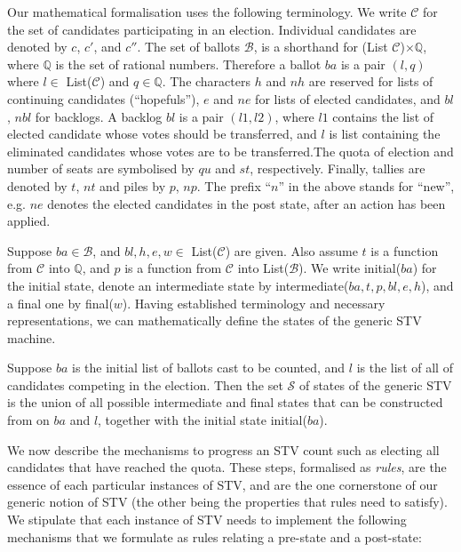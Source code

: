 \documentclass{llncs}
\begin{document}
\noindent
Our mathematical formalisation uses the following terminology. 
We write $\mathcal{C}$ for the set of candidates 
participating in an election. Individual candidates are denoted by 
$c$, $c'$, and $c''$. The set of ballots
$\mathcal{B}$, is a shorthand for (\textsf{List}
$\mathcal{C}$)$\times\mathbb{Q}$, where $\mathbb{Q}$ is the set of
rational numbers. Therefore a ballot $\mathit{ba}$ is a pair $(l,q)$ where
$l\in$ \textsf{List}($\mathcal{C}$) and $q\in\mathbb{Q}$. The
characters $h$ and $nh$ are reserved for lists of continuing
candidates (``hopefuls''), $e$ and $ne$ for lists of elected candidates, and $bl$,
$nbl$ for backlogs. A backlog $bl$ is a pair $(l1,l2)$, where $l1$
contains the list of elected candidate whose votes should be
transferred, and $l$ is list containing the eliminated candidates
whose votes are to be transferred.The quota of election and number of seats are symbolised by $qu$ and
$st$, respectively. Finally, tallies are denoted by $t$, $nt$ and
piles by $p$, $np$.  
 The prefix ``$n$'' in the above
stands for ``new'', e.g. $\mathit{ne}$ denotes the elected
candidates in the post state, after an action has been applied.


Suppose $ba \in\mathcal{B}$, and $bl , h, e, w \in$
\textsf{List}($\mathcal{C}$) are given. Also assume $t$ is a
function from $\mathcal{C}$ into $\mathbb{Q}$, and $p$ is a function
from $\mathcal{C}$ into \textsf{List}($\mathcal{B}$). We write
\textsf{initial}($ba$) for the initial state, denote an intermediate state by
\textsf{intermediate}($ba, t, p, bl, e, h$), and a final one by
\textsf{final}($w$). Having established terminology and necessary
representations, we can mathematically define the states of the
generic STV machine.  
\begin{definition}\label{stv:states}
Suppose $ba$ is the initial list of ballots cast to be counted, and
$l$ is the list of all of candidates competing in the election. Then
the set $\mathcal{S}$ of states of the generic STV is the union of
all 
possible intermediate and final states that can be constructed from on $ba$ and $l$,
together with the initial state \textsf{initial}($ba$).
\end{definition}
\noindent
We now describe the mechanisms to progress an STV count such as
electing all candidates that have reached the quota. 
These steps, formalised as \emph{rules},  are the essence of each particular instances of 
STV, and are the one cornerstone of our generic notion of STV (the
other being the properties that rules need to satisfy). We stipulate
that each instance of STV needs to implement the following
mechanisms that we formulate as rules relating a pre-state and a
post-state:
\end{document}
